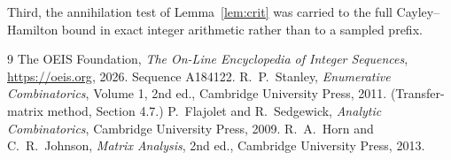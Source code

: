 \documentclass[11pt,a4paper]{article}
\theoremstyle{plain}
\theoremstyle{definition}
\begin{document}
Third, the annihilation test of Lemma~\ref{lem:crit} was carried to the full
Cayley--Hamilton bound in exact integer arithmetic rather than to a sampled prefix.

\begin{thebibliography}{9}
 The OEIS Foundation, \emph{The On-Line Encyclopedia of Integer
Sequences}, \url{https://oeis.org}, 2026. Sequence A184122.
 R.~P.~Stanley, \emph{Enumerative Combinatorics}, Volume 1, 2nd ed.,
Cambridge University Press, 2011. (Transfer-matrix method, Section 4.7.)
 P.~Flajolet and R.~Sedgewick, \emph{Analytic Combinatorics}, Cambridge
University Press, 2009.
 R.~A.~Horn and C.~R.~Johnson, \emph{Matrix Analysis}, 2nd ed., Cambridge
University Press, 2013.
\end{thebibliography}
\end{document}
